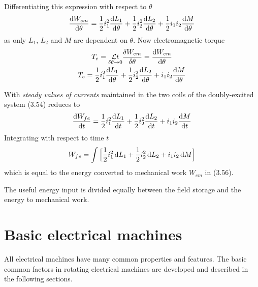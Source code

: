 \documentclass[a4paper,numbers=noenddot,12pt]{scrbook}
\begin{document}
            Differentiating this expression with respect to $\theta$
            \begin{equation*}
                \dfrac{\dif W_{em}}{\dif \theta} = \dfrac{1}{2} i_1^2 \dfrac{\dif L_1}{\dif \theta} + \dfrac{1}{2} i_2^2 \dfrac{\dif L_2}{\dif \theta} + \dfrac{1}{2} i_1 i_2 \dfrac{\dif M}{\dif \theta}
            \end{equation*}
            as only $L_1$, $L_2$ and $M$ are dependent on $\theta$. Now electromagnetic torque
            \begin{gather}
                T_e = \underset{\delta \theta \to 0}{\mathcal{L} t} \dfrac{\delta W_{em}}{\delta \theta} = \dfrac{\dif W_{em}}{\dif \theta} \nonumber \\
                T_e = \dfrac{1}{2} i_1^2 \dfrac{\dif L_1}{\dif \theta} +\dfrac{1}{2} i_2^2 \dfrac{\dif L_2}{\dif \theta} + i_1 i_2 \dfrac{\dif M}{\dif \theta}
                \label{eq:Eq3.57}
            \end{gather}

            With \textit{steady values of currents} maintained in the two coils of the doubly-excited system (3.54) reduces to
            \begin{equation*}
                \dfrac{\dif W_{fe}}{\dif t} = \dfrac{1}{2} i_1^2 \dfrac{\dif L_1}{\dif t} + \dfrac{1}{2} i_2^2 \dfrac{\dif L_2}{\dif t} + i_1 i_2 \dfrac{\dif M}{\dif t}
            \end{equation*}
            Integrating with respect to time $t$
            \begin{equation}
                W_{fe} = \int \Big[ \dfrac{1}{2} i_1^2 \dif L_1 + \dfrac{1}{2} i_2^2 \dif L_2 + i_1 i_2 \dif M \Big]
                \label{eq:Eq3.58}
            \end{equation}
            which is equal to the energy converted to mechanical work $W_{em}$ in (3.56).

            The useful energy input is divided equally between the field storage and the energy to mechanical work.

            \chapter{Basic electrical machines}
            All electrical machines have many common properties and features. The basic common factors in rotating electrical machines are developed and described in the following sections. 
\end{document}
